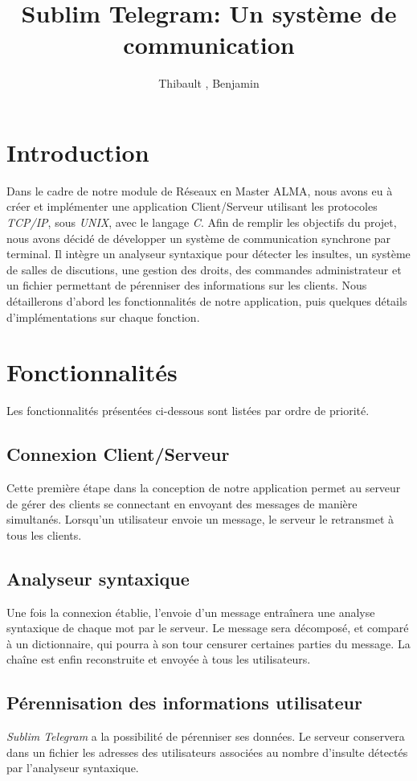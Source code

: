\documentclass[a4paper, 12pt]{article}
\author{Thibault \bsc{Béziers la Fosse}, Benjamin \bsc{Moreau}}
\title{Sublim Telegram: Un système de communication}
\begin{document}
\maketitle
\clearpage
\tableofcontents
\clearpage

\section{Introduction}
Dans le cadre de notre module de Réseaux en Master ALMA, nous avons eu à créer et implémenter une application Client/Serveur utilisant les protocoles \emph{TCP/IP}, sous \emph{UNIX}, avec le langage \emph{C}. 
Afin de remplir les objectifs du projet, nous avons décidé de développer un système de communication synchrone par terminal. Il intègre un analyseur syntaxique pour détecter les insultes, un système de salles de discutions, une gestion des droits, des commandes administrateur et un fichier permettant de pérenniser des informations sur les clients. 
Nous détaillerons d'abord les fonctionnalités de notre application, puis quelques détails d'implémentations sur chaque fonction. 
\section{Fonctionnalités}
Les fonctionnalités présentées ci-dessous sont listées par ordre de priorité.
\subsection{Connexion Client/Serveur}
Cette première étape dans la conception de notre application permet au serveur de gérer des clients se connectant en envoyant des messages de manière simultanés. Lorsqu'un utilisateur envoie un message, le serveur le retransmet à tous les clients.
\subsection{Analyseur syntaxique}
Une fois la connexion établie, l'envoie d'un message entraînera une analyse syntaxique de chaque mot par le serveur. Le message sera décomposé, et comparé à un dictionnaire, qui pourra à son tour censurer certaines parties du message. La chaîne est enfin reconstruite et envoyée à tous les utilisateurs.  
\subsection{Pérennisation des informations utilisateur}
\emph{Sublim Telegram} a la possibilité de pérenniser ses données. Le serveur conservera dans un fichier les adresses des utilisateurs associées au nombre d'insulte détectés par l'analyseur syntaxique.
\end{document}
